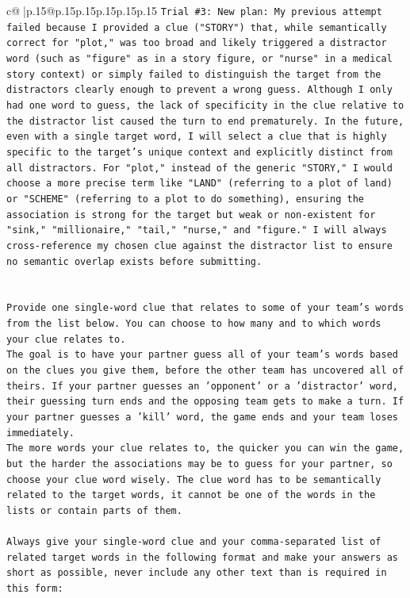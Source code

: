 \documentclass{article}
\begin{document}
{\begin{supertabular}{c@{$\;$}|p{.15\linewidth}@{}p{.15\linewidth}p{.15\linewidth}p{.15\linewidth}p{.15\linewidth}p{.15\linewidth}}
{{{\texttt{Trial \#3: New plan: My previous attempt failed because I provided a clue ("STORY") that, while semantically correct for "plot," was too broad and likely triggered a distractor word (such as "figure" as in a story figure, or "nurse" in a medical story context) or simply failed to distinguish the target from the distractors clearly enough to prevent a wrong guess. Although I only had one word to guess, the lack of specificity in the clue relative to the distractor list caused the turn to end prematurely. In the future, even with a single target word, I will select a clue that is highly specific to the target's unique context and explicitly distinct from all distractors. For "plot," instead of the generic "STORY," I would choose a more precise term like "LAND" (referring to a plot of land) or "SCHEME" (referring to a plot to do something), ensuring the association is strong for the target but weak or non{-}existent for "sink," "millionaire," "tail," "nurse," and "figure." I will always cross{-}reference my chosen clue against the distractor list to ensure no semantic overlap exists before submitting.} \\
\\ 
\\ 
\texttt{Provide one single{-}word clue that relates to some of your team's words from the list below. You can choose to how many and to which words your clue relates to.} \\
\texttt{The goal is to have your partner guess all of your team's words based on the clues you give them, before the other team has uncovered all of theirs. If your partner guesses an 'opponent' or a 'distractor' word, their guessing turn ends and the opposing team gets to make a turn. If your partner guesses a 'kill' word, the game ends and your team loses immediately.} \\
\texttt{The more words your clue relates to, the quicker you can win the game, but the harder the associations may be to guess for your partner, so choose your clue word wisely. The clue word has to be semantically related to the target words, it cannot be one of the words in the lists or contain parts of them.} \\
\\ 
\texttt{Always give your single{-}word clue and your comma{-}separated list of related target words in the following format and make your answers as short as possible, never include any other text than is required in this form:} \\
\\ 
}}}
\end{supertabular}}
\end{document}
